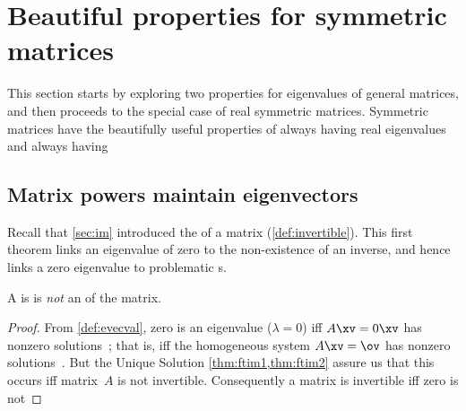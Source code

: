 

\section{Beautiful properties for symmetric matrices}
\label{sec:sm}
\secttoc

\begin{comment}
\pooliv{\S5.4} \layiv{\S7.1} \holti{\S8.3} \cite[\S10]{Davis99a}
\end{comment}



This section starts by exploring two properties for eigenvalues of general matrices, and then proceeds to the special case of real symmetric  matrices.
Symmetric matrices have the beautifully useful properties of always having real eigenvalues and always having 



\subsection{Matrix powers maintain eigenvectors}
\label{sec:mpmev}

Recall that \cref{sec:im} introduced the  of a matrix (\cref{def:invertible}).
This first theorem links an eigenvalue of zero to the non-existence of an inverse, and hence links a zero eigenvalue to problematic s.


\begin{theorem} \label{thm:evalinv} 
A  is    is \emph{not} an  of the matrix.
\end{theorem}
\begin{proof} 
From \cref{def:evecval}, zero is an eigenvalue (\(\lambda=0\)) iff \(A\xv=0\xv\) has nonzero solutions~\xv; that is, iff the homogeneous system \(A\xv=\ov\) has nonzero solutions~\xv.
But the Unique Solution \cref{thm:ftim1,thm:ftim2} assure us that this occurs iff matrix~\(A\) is not invertible.
Consequently a matrix is invertible iff zero is not 
\end{proof}

